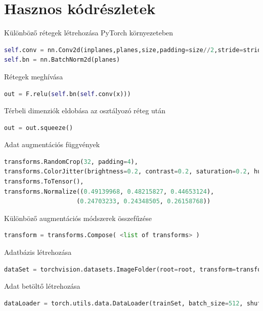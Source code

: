 \documentclass[12pt,a4paper,oneside]{report}             %
\begin{document}
\chapter{Hasznos kódrészletek}

Különböző rétegek létrehozása PyTorch környezeteben

\begin{lstlisting}[language=Python]
self.conv = nn.Conv2d(inplanes,planes,size,padding=size//2,stride=stride)
self.bn = nn.BatchNorm2d(planes)
\end{lstlisting}

Rétegek meghívása

\begin{lstlisting}[language=Python]
out = F.relu(self.bn(self.conv(x)))
\end{lstlisting}

Térbeli dimenziók eldobása az osztályozó réteg után

\begin{lstlisting}[language=Python]
out = out.squeeze()
\end{lstlisting}

Adat augmentációs függvények

\begin{lstlisting}[language=Python]
transforms.RandomCrop(32, padding=4),
transforms.ColorJitter(brightness=0.2, contrast=0.2, saturation=0.2, hue=0.1),
transforms.ToTensor(),
transforms.Normalize((0.49139968, 0.48215827, 0.44653124),
					(0.24703233, 0.24348505, 0.26158768))
\end{lstlisting}

Különböző augmentációs módszerek összefűzése

\begin{lstlisting}[language=Python]
transform = transforms.Compose( <list of transforms> )
\end{lstlisting}

Adatbázis létrehozása

\begin{lstlisting}[language=Python]
dataSet = torchvision.datasets.ImageFolder(root=root, transform=transform)
\end{lstlisting}

Adat betöltő létrehozása

\begin{lstlisting}[language=Python]
dataLoader = torch.utils.data.DataLoader(trainSet, batch_size=512, shuffle=True, num_workers=4)
\end{lstlisting}
\end{document}
